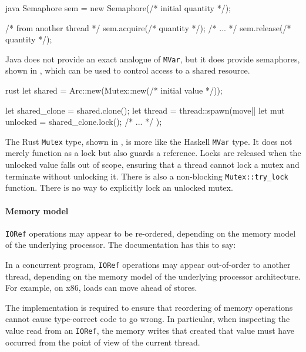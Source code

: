 \begin{listing}
\centering
\begin{cminted}{java}
Semaphore sem = new Semaphore(/* initial quantity */);

/* from another thread */
sem.acquire(/* quantity */);
/* ... */
sem.release(/* quantity */);
\end{cminted}
\caption{Mutual exclusion in Java.}\label{lst:mute_java}
\end{listing}

Java does not provide an exact analogue of \verb|MVar|, but it does
provide semaphores, shown in , which can be used
to control access to a shared resource.

\begin{listing}
\centering
\begin{cminted}{rust}
let shared = Arc::new(Mutex::new(/* initial value */));

let shared_clone = shared.clone();
let thread = thread::spawn(move|| {
    let mut unlocked = shared_clone.lock();
    /* ... */
});
\end{cminted}
\caption{Mutual exclusion in Rust.}\label{lst:mute_rust}
\end{listing}

The Rust \verb|Mutex| type, shown in , is more
like the Haskell \verb|MVar| type.  It does not merely function as a
lock but also guards a reference.  Locks are released when the
unlocked value falls out of scope, ensuring that a thread cannot lock
a mutex and terminate without unlocking it.  There is also a
non-blocking \verb|Mutex::try_lock| function.  There is no way to
explicitly lock an unlocked mutex.

\paragraph{Memory model}
\verb|IORef| operations may appear to be re-ordered, depending on the
memory model of the underlying processor.  The documentation has this
to say:

\begin{displayquote}
  In a concurrent program, \verb|IORef| operations may appear out-of-order to
  another thread, depending on the memory model of the underlying processor
  architecture.  For example, on x86, loads can move ahead of stores.

  The implementation is required to ensure that reordering of memory operations
  cannot cause type-correct code to go wrong.  In particular, when inspecting
  the value read from an \verb|IORef|, the memory writes that created that value
  must have occurred from the point of view of the current thread.\cite{ghc2017}
\end{displayquote}

